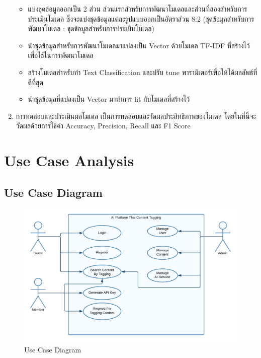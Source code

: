 \documentclass[12pt,oneside,openright,a4paper]{cpe-thai-project}
\begin{document}
\begin{enumerate}
          \begin{itemize}
            \item แบ่งชุดข้อมูลออกเป็น 2 ส่วน ส่วนแรกสำหรับการพัฒนาโมเดลและส่วนที่สองสำหรับการประเมินโมเดล 
            ซึ่งจะแบ่งชุดข้อมูลแต่ละรูปแบบออกเป็นอัตราส่วน 8:2 (ชุดข้อมูลสำหรับการพัฒนาโมเดล : ชุดข้อมูลสำหรับการประเมินโมเดล) 
            \item นำชุดข้อมูลสำหรับการพัฒนาโมเดลมาแปลงเป็น Vector ด้วยโมเดล TF-IDF ที่สร้างไว้ เพื่อใช้ในการพัฒนาโมเดล
            \item สร้างโมเดลสำหรับทำ Text Classification และปรับ tune พารามิเตอร์เพื่อให้ได้ผลลัพธ์ที่ดีที่สุด
            \item นำชุดข้อมูลที่แปลงเป็น Vector มาทำการ fit กับโมเดลที่สร้างไว้
          \end{itemize}
    \item การทดสอบและประเมินผลโมเดล 
          \newline\hspace*{1cm}เป็นการทดสอบและวัดผลประสิทธิภาพของโมเดล โดยในที่นี้จะวัดผลด้วยการใช้ค่า Accuracy, Precision, Recall และ F1 Score
  \end{enumerate}

\section{Use Case Analysis}
\subsection{Use Case Diagram}
\begin{figure}[!ht]\centering
  \includegraphics[width=13cm]{./img/usecase.png}
  \caption{Use Case Diagram}\label{fig:usecase} 
\end{figure}
\end{document}
